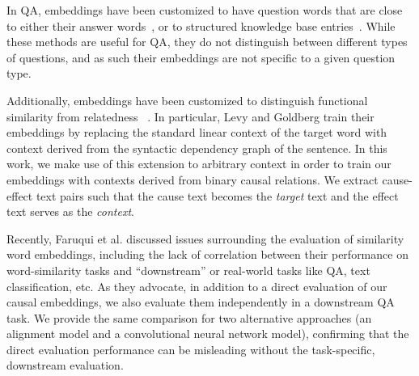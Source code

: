 In QA, embeddings have been customized to have question words that are close to either their answer words~\cite{bordes2014question}, or to structured knowledge base entries~\cite{yang2014joint}.  While these methods are useful for QA, they do not distinguish between different types of questions, and as such their embeddings are not specific to a given question type.

Additionally, embeddings have been customized to distinguish functional similarity from relatedness ~\cite{levy2014dependency,kielaspecializing}.
In particular, Levy and Goldberg train their embeddings by replacing the standard linear context of the target word with context derived from the syntactic dependency graph of the sentence.  
In this work, we make use of this extension to arbitrary context in order to train our embeddings with contexts derived from binary causal relations.  We extract cause-effect text pairs such that the cause text becomes the \emph{target} text and the effect text serves as the \emph{context}. 

Recently, Faruqui et al.\citeyear{faruqui2016problems} discussed issues surrounding the evaluation of similarity word embeddings, including the lack of correlation between their performance on word-similarity tasks and ``downstream'' or real-world tasks like QA, text classification, etc.  As they advocate, in addition to a direct evaluation of our causal embeddings, we also evaluate them independently in a downstream QA task.  We provide the same comparison for two alternative approaches (an alignment model and a convolutional neural network model), confirming that the direct evaluation performance can be misleading without the task-specific, downstream evaluation. 



